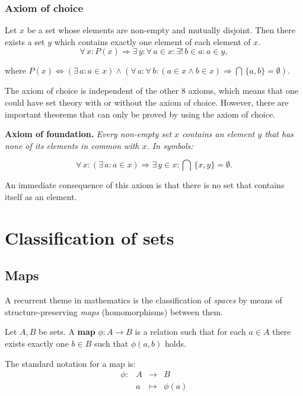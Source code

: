\documentclass[root.tex]{subfiles}
\begin{document}
\subsection{Axiom of choice}
Let $x$ be a set whose elements are non-empty and mutually disjoint. Then there exists a set $y$ which contains exactly one element of each element of $x$.
$$
\forall \, x : P(x) \Rightarrow \exists \, y : \forall \, a \in x :\exists! \, b \in a : a \in y,
$$

where $P(x) \Leftrightarrow (\exists \,a : a \in x) \land (\forall \, a : \forall \, b : (a\in x \land b \in x) \Rightarrow \bigcap \, \{a,b\} = \emptyset )$.

\begin{remark}
The axiom of choice is independent of the other 8 axioms, which means that one could have set theory with or without the axiom of choice. However, there are important theorems that can only be proved by using the axiom of choice. 
\end{remark}

\textbf{Axiom of foundation.} \emph{Every non-empty set $x$ contains an element $y$ that has none of its elements in common with $x$. In symbols:}

$$
\forall \, x : (\exists \,a : a \in x) \Rightarrow \exists \, y \in x : \bigcap \, \{x,y\} = \emptyset .
$$

An immediate consequence of this axiom is that there is no set that contains itself as an element.\\

\chapter{Classification of sets}%

\section{Maps}%
A recurrent theme in mathematics is the classification of \emph{spaces} by means of structure-preserving \emph{maps} (homomorphisms) between them. 

\begin{mydef}
  Let $A,B$ be sets. A \textbf{map} $\phi : A \to B$ is a relation such that for each $a \in A$ there exists exactly one $b \in B$ such that $\phi(a,b)$ holds.
\end{mydef}
The standard notation for a map is:
\begin{equation}
\begin{aligned}
\phi :& A   & \to     & B\\
      & a   & \mapsto & \phi(a)
\end{aligned}
\end{equation}
\end{document}
